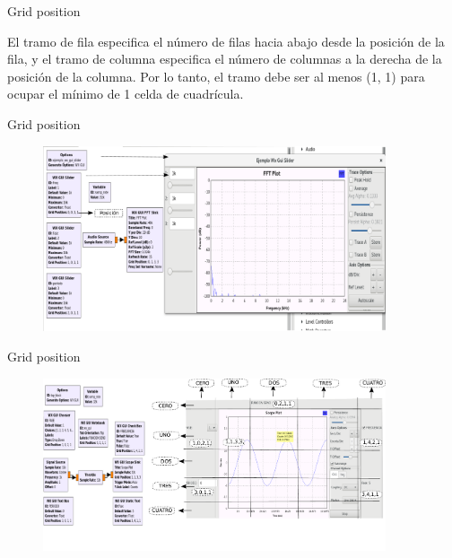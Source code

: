 \begin{frame}{Grid position}

El tramo de fila especifica el número de filas hacia abajo desde la posición de la fila, y el tramo de columna especifica el número de columnas a la derecha de la posición de la columna. Por lo tanto, el tramo debe ser al menos (1, 1) para ocupar el mínimo de 1 celda de cuadrícula.

\end{frame}

\begin{frame}{Grid position}

\begin{figure}[H]
\centering
\vspace{-3mm}
\includegraphics[width=0.9\textwidth]{parte1/lab2-2/pdf/lab0_2.pdf}
\end{figure}

\end{frame}

\begin{frame}{Grid position}

\begin{figure}[H]
\centering
\vspace{-3mm}
\includegraphics[width=0.9\textwidth]{parte1/lab2-2/pdf/lab0_3.pdf}
\end{figure}

\end{frame}

